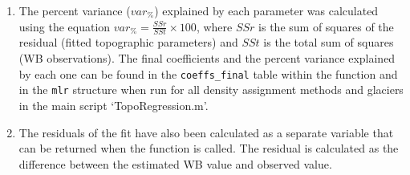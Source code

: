 \documentclass{sfuthesis}
\begin{document}
\begin{appendices}
\begin{enumerate}
\item The percent variance ($var_\%$) explained by each parameter was calculated using the equation $var_\% = \frac{SSr}{SSt}\times 100$, where $SSr$ is the sum of squares of the residual (fitted topographic parameters) and $SSt$ is the total sum of squares (WB observations). The final coefficients and the percent variance explained by each one can be found in the \texttt{coeffs\_final} table within the function and in the \texttt{mlr} structure when run for all density assignment methods and glaciers in the main script `TopoRegression.m'.

\item The residuals of the fit have also been calculated as a separate variable that can be returned when the function is called. The residual is calculated as the difference between the estimated WB value and observed value. 
\end{enumerate}
	
	

\end{appendices}
\end{document}
